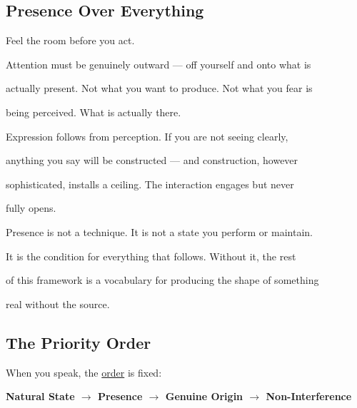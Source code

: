 \documentclass[12pt, a4paper]{article}
\begin{document}

\subsection{Presence Over Everything}

Feel the room before you act.

Attention must be genuinely outward --- off yourself and onto what is

actually present. Not what you want to produce. Not what you fear is

being perceived. What is actually there.

Expression follows from perception. If you are not seeing clearly,

anything you say will be constructed --- and construction, however

sophisticated, installs a ceiling. The interaction engages but never

fully opens.

Presence is not a technique. It is not a state you perform or maintain.

It is the condition for everything that follows. Without it, the rest

of this framework is a vocabulary for producing the shape of something

real without the source.


\subsection{The Priority Order}

When you speak, the \hyperref[subsec:priority]{order} is fixed:

\begin{center}

\textbf{Natural State $\rightarrow$ Presence $\rightarrow$ Genuine Origin $\rightarrow$ Non-Interference}

\end{center}
\end{document}
